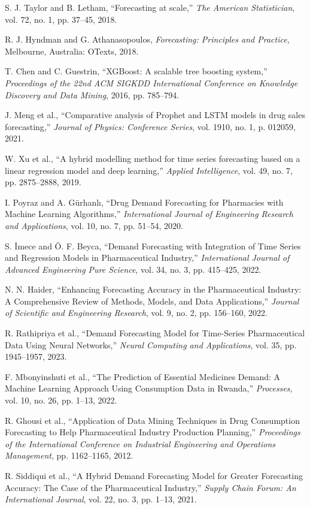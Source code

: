 \documentclass[journal]{IEEEtran}
\begin{document}
\begin{thebibliography}{99}

S. J. Taylor and B. Letham, “Forecasting at scale,” \textit{The American Statistician}, vol. 72, no. 1, pp. 37–45, 2018.

R. J. Hyndman and G. Athanasopoulos, \textit{Forecasting: Principles and Practice}, Melbourne, Australia: OTexts, 2018.

T. Chen and C. Guestrin, “XGBoost: A scalable tree boosting system,” \textit{Proceedings of the 22nd ACM SIGKDD International Conference on Knowledge Discovery and Data Mining}, 2016, pp. 785–794.

J. Meng et al., “Comparative analysis of Prophet and LSTM models in drug sales forecasting,” \textit{Journal of Physics: Conference Series}, vol. 1910, no. 1, p. 012059, 2021.

W. Xu et al., “A hybrid modelling method for time series forecasting based on a linear regression model and deep learning,” \textit{Applied Intelligence}, vol. 49, no. 7, pp. 2875–2888, 2019.

I. Poyraz and A. Gürhanlı, “Drug Demand Forecasting for Pharmacies with Machine Learning Algorithms,” \textit{International Journal of Engineering Research and Applications}, vol. 10, no. 7, pp. 51–54, 2020.

S. İmece and Ö. F. Beyca, “Demand Forecasting with Integration of Time Series and Regression Models in Pharmaceutical Industry,” \textit{International Journal of Advanced Engineering Pure Science}, vol. 34, no. 3, pp. 415–425, 2022.

N. N. Haider, “Enhancing Forecasting Accuracy in the Pharmaceutical Industry: A Comprehensive Review of Methods, Models, and Data Applications,” \textit{Journal of Scientific and Engineering Research}, vol. 9, no. 2, pp. 156–160, 2022.

R. Rathipriya et al., “Demand Forecasting Model for Time-Series Pharmaceutical Data Using Neural Networks,” \textit{Neural Computing and Applications}, vol. 35, pp. 1945–1957, 2023.

F. Mbonyinshuti et al., “The Prediction of Essential Medicines Demand: A Machine Learning Approach Using Consumption Data in Rwanda,” \textit{Processes}, vol. 10, no. 26, pp. 1–13, 2022.

R. Ghousi et al., “Application of Data Mining Techniques in Drug Consumption Forecasting to Help Pharmaceutical Industry Production Planning,” \textit{Proceedings of the International Conference on Industrial Engineering and Operations Management}, pp. 1162–1165, 2012.

R. Siddiqui et al., “A Hybrid Demand Forecasting Model for Greater Forecasting Accuracy: The Case of the Pharmaceutical Industry,” \textit{Supply Chain Forum: An International Journal}, vol. 22, no. 3, pp. 1–13, 2021.

\end{thebibliography}
\end{document}
